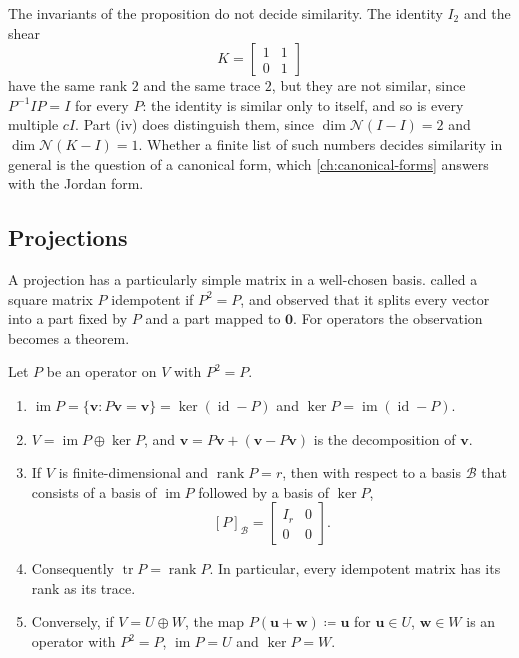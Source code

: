 The invariants of the proposition do not decide similarity. The identity $I_2$ and the shear
\[
K=\begin{bmatrix}1&1\\0&1\end{bmatrix}
\]
have the same rank $2$ and the same trace $2$, but they are not similar, since $P^{-1}IP=I$ for every $P$: the identity is similar only to itself, and so is every multiple $cI$. Part (iv) does distinguish them, since $\dim\mathcal N(I-I)=2$ and $\dim\mathcal N(K-I)=1$. Whether a finite list of such numbers decides similarity in general is the question of a canonical form, which \cref{ch:canonical-forms} answers with the Jordan form.

\subsection{Projections}

A projection has a particularly simple matrix in a well-chosen basis.  called a square matrix $P$ idempotent if $P^2=P$, and observed that it splits every vector into a part fixed by $P$ and a part mapped to $\mathbf 0$. For operators the observation becomes a theorem.

\begin{proposition}[Projections]
\label{prop:projection}
Let $P$ be an operator on $V$ with $P^2=P$.
\begin{enumerate}
\item $\operatorname{im}P=\{\mathbf v: P\mathbf v=\mathbf v\}=\ker(\operatorname{id}-P)$ and $\ker P=\operatorname{im}(\operatorname{id}-P)$.
\item $V=\operatorname{im}P\oplus\ker P$, and $\mathbf v=P\mathbf v+(\mathbf v-P\mathbf v)$ is the decomposition of $\mathbf v$.
\item If $V$ is finite-dimensional and $\operatorname{rank}P=r$, then with respect to a basis $\mathcal B$ that consists of a basis of $\operatorname{im}P$ followed by a basis of $\ker P$,
\[
[P]_{\mathcal B}=\begin{bmatrix}I_r&0\\0&0\end{bmatrix}.
\]
\item Consequently $\operatorname{tr}P=\operatorname{rank}P$. In particular, every idempotent matrix has its rank as its trace.
\item Conversely, if $V=U\oplus W$, the map $P(\mathbf u+\mathbf w)\coloneqq\mathbf u$ for $\mathbf u\in U$, $\mathbf w\in W$ is an operator with $P^2=P$, $\operatorname{im}P=U$ and $\ker P=W$.
\end{enumerate}
\end{proposition}

